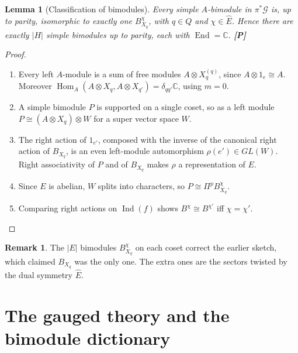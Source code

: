 \documentclass[11pt]{article}
\newtheorem{lemma}[theorem]{Lemma}
\theoremstyle{definition}
\newtheorem{remark}[theorem]{Remark}
\newcommand{\cG}{\mathcal G}
\newcommand{\Ind}{\operatorname{Ind}}
\newcommand{\Hom}{\operatorname{Hom}}
\newcommand{\End}{\operatorname{End}}
\newcommand{\C}{\mathbb C}
\newcommand{\Ehat}{\widehat E}
\newcommand{\st}[1]{\textbf{[#1]}}
\begin{document}
\begin{lemma}[Classification of bimodules]\label{lem:B}
Every simple $A$-bimodule in $\pi^*\cG$ is, up to parity, isomorphic to exactly one $B_{X_q}^\chi$,
with $q\in Q$ and $\chi\in\Ehat$. Hence there are exactly $|H|$ simple bimodules up to parity,
each with $\End=\C$. \st{P}
\end{lemma}
\begin{proof}
\begin{enumerate}[nosep]
\item Every left $A$-module is a sum of free modules $A\otimes X_q^{(q)}$, since $A\otimes1_e\cong A$.
Moreover $\Hom_A(A\otimes X_q,A\otimes X_{q'})=\delta_{qq'}\C$, using $m=0$.
\item A simple bimodule $P$ is supported on a single coset, so as a left module
$P\cong(A\otimes X_q)\otimes W$ for a super vector space $W$.
\item The right action of $1_{e'}$, composed with the inverse of the canonical right action of
$B_{X_q}$, is an even left-module automorphism $\rho(e')\in GL(W)$. Right associativity of $P$
and of $B_{X_q}$ makes $\rho$ a representation of $E$.
\item Since $E$ is abelian, $W$ splits into characters, so $P\cong\Pi^pB^\chi_{X_q}$.
\item Comparing right actions on $\Ind(f)$ shows $B^\chi\cong B^{\chi'}$ iff $\chi=\chi'$.
\end{enumerate}
\end{proof}

\begin{remark}
The $|E|$ bimodules $B_{X_q}^\chi$ on each coset correct the earlier sketch, which claimed
$B_{X_q}$ was the only one. The extra ones are the sectors twisted by the dual symmetry $\Ehat$.
\end{remark}

\section{The gauged theory and the bimodule dictionary}\label{sec:gauged}
\end{document}

